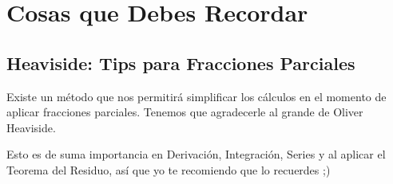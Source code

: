 \documentclass[12pt, fleqn]{report}                             %
\begin{document}
    \chapter{Cosas que Debes Recordar}


        \clearpage
        \section{Heaviside: Tips para Fracciones Parciales}


            Existe un método que nos permitirá simplificar los cálculos en el
            momento de aplicar fracciones parciales.
            Tenemos que agradecerle al grande de Oliver Heaviside.

            Esto es de suma importancia en Derivación, Integración, Series y al aplicar
            el Teorema del Residuo, así que yo te recomiendo que lo recuerdes ;)
\end{document}
